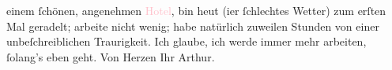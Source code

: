                einem ſchönen, angenehmen \textcolor{pink}{Hotel}{},
               bin heut (i{\geminationm}er ſchlechtes Wetter) zum erſten Mal
               geradelt; arbeite nicht wenig; habe natürlich zuweilen Stunden von einer
               unbeſchreiblichen Traurigkeit. Ich glaube, ich werde immer mehr arbeiten, ſolang’s
               eben geht.\pend
           \pstart Von Herzen Ihr \spacefill\mbox{Arthur.}\pend{}\endnumbering{}  
      